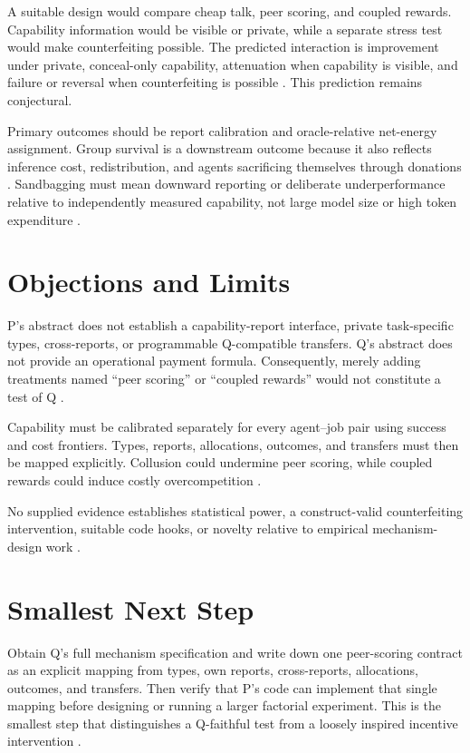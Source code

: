 \documentclass{article}
\begin{document}
A suitable design would compare cheap talk, peer scoring, and coupled rewards. Capability information would be visible or private, while a separate stress test would make counterfeiting possible. The predicted interaction is improvement under private, conceal-only capability, attenuation when capability is visible, and failure or reversal when counterfeiting is possible . This prediction remains conjectural.

Primary outcomes should be report calibration and oracle-relative net-energy assignment. Group survival is a downstream outcome because it also reflects inference cost, redistribution, and agents sacrificing themselves through donations . Sandbagging must mean downward reporting or deliberate underperformance relative to independently measured capability, not large model size or high token expenditure .

\section{Objections and Limits}

P's abstract does not establish a capability-report interface, private task-specific types, cross-reports, or programmable Q-compatible transfers. Q's abstract does not provide an operational payment formula. Consequently, merely adding treatments named ``peer scoring'' or ``coupled rewards'' would not constitute a test of Q .

Capability must be calibrated separately for every agent--job pair using success and cost frontiers. Types, reports, allocations, outcomes, and transfers must then be mapped explicitly. Collusion could undermine peer scoring, while coupled rewards could induce costly overcompetition .

No supplied evidence establishes statistical power, a construct-valid counterfeiting intervention, suitable code hooks, or novelty relative to empirical mechanism-design work .

\section{Smallest Next Step}

Obtain Q's full mechanism specification and write down one peer-scoring contract as an explicit mapping from types, own reports, cross-reports, allocations, outcomes, and transfers. Then verify that P's code can implement that single mapping before designing or running a larger factorial experiment. This is the smallest step that distinguishes a Q-faithful test from a loosely inspired incentive intervention .
\end{document}
